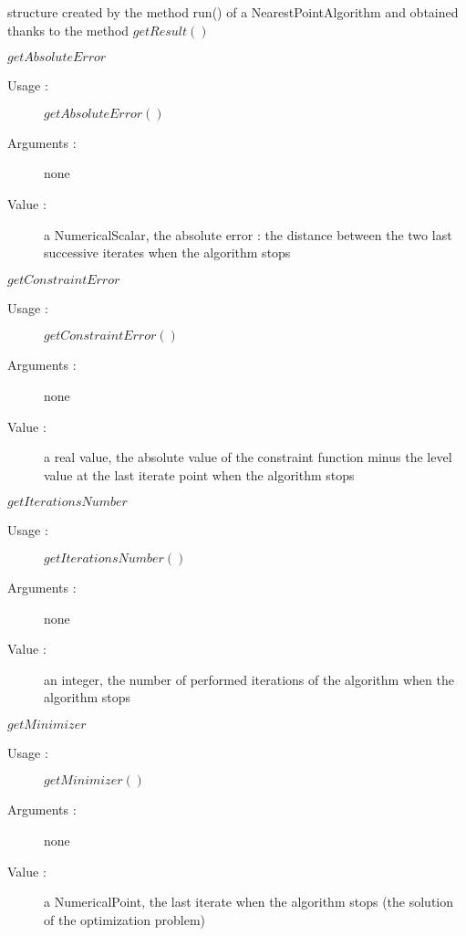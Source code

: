 \begin{description}
\item[Usage :] structure created by the method run() of a NearestPointAlgorithm and obtained thanks to the method $getResult()$

\item[Some methods :]  \rule{0pt}{1em}

  \begin{description}

  \item $getAbsoluteError$
    \begin{description}
    \item[Usage :] $getAbsoluteError()$
    \item[Arguments :] none
    \item[Value :]  a NumericalScalar, the absolute error : the distance between the two last successive iterates when the algorithm stops
    \end{description}
    \bigskip

  \item $getConstraintError$
    \begin{description}
    \item[Usage :] $getConstraintError()$
    \item[Arguments :] none
    \item[Value :] a real value, the absolute value of the constraint function minus the level value at the last iterate point when the algorithm stops
    \end{description}
    \bigskip

  \item $getIterationsNumber$
    \begin{description}
    \item[Usage :] $getIterationsNumber()$
    \item[Arguments :] none
    \item[Value :]  an integer, the  number of performed iterations of the algorithm when the algorithm stops
    \end{description}
    \bigskip

  \item $getMinimizer$
    \begin{description}
    \item[Usage :] $getMinimizer()$
    \item[Arguments :] none
    \item[Value :]  a NumericalPoint, the last iterate when the algorithm stops (the solution of the optimization problem)
    \end{description}
    \bigskip


\end{description}
\end{description}
